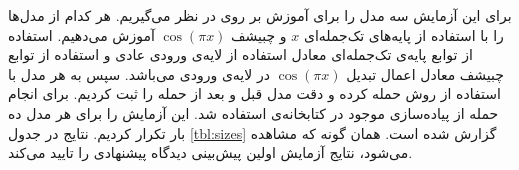 \documentclass[12pt,onecolumn,a4paper]{article}
\begin{document}
برای این آزمایش سه مدل را برای آموزش بر روی
در نظر می‌گیریم. هر کدام از مدل‌ها را با استفاده از پایه‌های تک‌جمله‌ای $x$ و چبیشف $\cos(\pi x)$ آموزش می‌دهیم. استفاده از توابع پایه‌ی تک‌جمله‌ای معادل استفاده از لایه‌ی ورودی عادی و استفاده از توابع چبیشف معادل اعمال تبدیل $\cos(\pi x)$ در لایه‌ی ورودی می‌باشد. سپس به هر مدل با استفاده از روش
حمله کرده و  دقت مدل قبل و بعد از حمله را ثبت کردیم. برای انجام حمله از پیاده‌سازی موجود در کتابخانه‌ی  استفاده شد. این آزمایش را برای هر مدل ده بار تکرار کردیم. نتایج در جدول
\ref{tbl:sizes}
گزارش شده است. همان گونه که مشاهده می‌شود، نتایج آزمایش اولین پیش‌بینی دیدگاه پیشنهادی را تایید می‌کند.

\begin{table}[]
    \begin{latin}
    \end{latin}
    \caption{مدل‌های استفاده شده در آزمایش، ابعاد آنها و دقت آنها قبل و پس از حمله‌ی . همان طور که مشاهده می‌شود، استفاده از توابع پایه‌ی چبیشف به صورت معنی داری باعث بهبود مقاومت در برابر حمله می‌شود.}
    \label{tbl:sizes}
\end{table}
\end{document}
